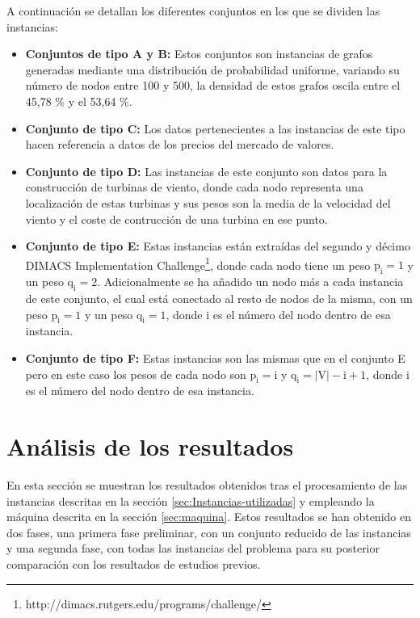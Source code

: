 A continuación se detallan los diferentes conjuntos en los que se dividen las instancias:

\begin{itemize}
	
	\item \textbf{Conjuntos de tipo A y B:} Estos conjuntos son instancias de grafos generadas mediante una distribución de probabilidad uniforme, variando su número de nodos entre 100 y 500, la densidad de estos grafos oscila entre el 45,78 \% y el 53,64 \%.
	\item  \textbf{Conjunto de tipo C:} Los datos pertenecientes a las instancias de este tipo hacen referencia a datos de los precios del mercado de valores.
	\item  \textbf{Conjunto de tipo D:} Las instancias de este conjunto son datos para la construcción de turbinas de viento, donde cada nodo representa una localización de estas turbinas y sus pesos son la media de la velocidad del viento y el coste de contrucción de una turbina en ese punto.
	\item  \textbf{Conjunto de tipo E:} Estas instancias están extraídas del segundo y décimo DIMACS Implementation Challenge\footnote{http://dimacs.rutgers.edu/programs/challenge/}, donde cada nodo tiene un peso $\mathrm{p_{i} = 1}$ y un peso $\mathrm{q_{i} = 2}$. Adicionalmente se ha añadido un nodo más a cada instancia de este conjunto, el cual está conectado al resto de nodos de la misma, con un peso $\mathrm{p_{i} = 1}$ y un peso $\mathrm{q_{i} = 1}$, donde i es el número del nodo dentro de esa instancia.
	\item  \textbf{Conjunto de tipo F:} Estas instancias son las mismas que en el conjunto E pero en este caso los pesos de cada nodo son $\mathrm{p_{i} = i}$ y $\mathrm{q_{i} = |V| - i + 1}$, donde i es el número del nodo dentro de esa instancia.
	
	
\end{itemize}


\section{Análisis de los resultados}
En esta sección se muestran los resultados obtenidos tras el procesamiento de las instancias descritas en la sección \ref{sec:Instancias-utilizadas} y empleando la máquina descrita en la sección \ref{sec:maquina}. Estos resultados se han obtenido en dos fases, una primera fase preliminar, con un conjunto reducido de las instancias y una segunda fase, con todas las instancias del problema para su posterior comparación con los resultados de estudios previos.

